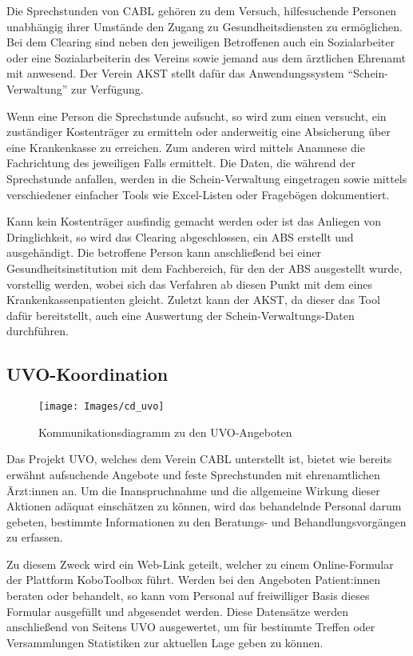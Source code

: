 Die Sprechstunden von \ac{CABL} gehören zu dem Versuch, hilfesuchende Personen unabhängig ihrer Umstände den Zugang zu Gesundheitsdiensten zu ermöglichen. Bei dem Clearing sind neben den jeweiligen Betroffenen auch ein Sozialarbeiter oder eine Sozialarbeiterin des Vereins sowie jemand aus dem ärztlichen Ehrenamt mit anwesend. Der Verein \ac{AKST} stellt dafür das Anwendungssystem \enquote{Schein-Verwaltung} zur Verfügung.

Wenn eine Person die Sprechstunde aufsucht, so wird zum einen versucht, ein zuständiger Kostenträger zu ermitteln oder anderweitig eine Absicherung über eine Krankenkasse zu erreichen. Zum anderen wird mittels Anamnese die Fachrichtung des jeweiligen Falls ermittelt. Die Daten, die während der Sprechstunde anfallen, werden in die Schein-Verwaltung eingetragen sowie mittels verschiedener einfacher Tools wie Excel-Listen oder Fragebögen dokumentiert.

Kann kein Kostenträger ausfindig gemacht werden oder ist das Anliegen von Dringlichkeit, so wird das Clearing abgeschlossen, ein \ac{ABS} erstellt und ausgehändigt. Die betroffene Person kann anschließend bei einer Gesundheitsinstitution mit dem Fachbereich, für den der \ac{ABS} ausgestellt wurde, vorstellig werden, wobei sich das Verfahren ab diesen Punkt mit dem eines Krankenkassenpatienten gleicht. Zuletzt kann der \ac{AKST}, da dieser das Tool dafür bereitstellt, auch eine Auswertung der Schein-Verwaltungs-Daten durchführen.

\subsection{UVO-Koordination}\label{sub:uvo}

\begin{figure}[h]
	\centering
	\texttt{[image: Images/cd\_uvo]}
	\caption[Kommunikationsdiagramm UVO-Angebote]{Kommunikationsdiagramm zu den UVO-Angeboten}
	\label{fig:cdUVO}
\end{figure}

Das Projekt \ac{UVO}, welches dem Verein \ac{CABL} unterstellt ist, bietet wie bereits erwähnt aufsuchende Angebote und feste Sprechstunden mit ehrenamtlichen Ärzt:innen an. Um die Inanspruchnahme und die allgemeine Wirkung dieser Aktionen adäquat einschätzen zu können, wird das behandelnde Personal darum gebeten, bestimmte Informationen zu den Beratungs- und Behandlungsvorgängen zu erfassen.

Zu diesem Zweck wird ein Web-Link geteilt, welcher zu einem Online-Formular der Plattform KoboToolbox führt. Werden bei den Angeboten Patient:innen beraten oder behandelt, so kann vom Personal auf freiwilliger Basis dieses Formular ausgefüllt und abgesendet werden. Diese Datensätze werden anschließend von Seitens \ac{UVO} ausgewertet, um für bestimmte Treffen oder Versammlungen Statistiken zur aktuellen Lage geben zu können.

